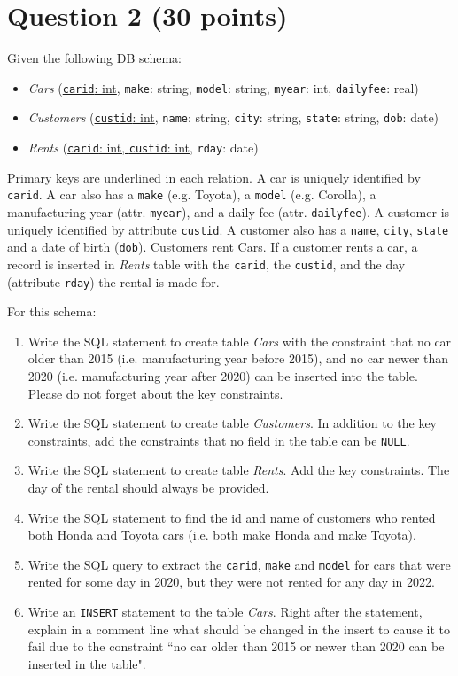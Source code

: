 \documentclass[letterpaper, 11pt]{article}
\begin{document}
\section*{Question 2 (30 points)}

Given the following DB schema:
\begin{itemize}
    \item \textit{Cars} (\ul{\texttt{carid}: int}, \texttt{make}: string, \texttt{model}: string, \texttt{myear}: int, \texttt{dailyfee}: real)
    \item \textit{Customers} (\ul{\texttt{custid}: int}, \texttt{name}: string, \texttt{city}: string, \texttt{state}: string, \texttt{dob}: date)
    \item \textit{Rents} (\ul{\texttt{carid}: int, \texttt{custid}: int}, \texttt{rday}: date)
\end{itemize}

Primary keys are underlined in each relation. A car is uniquely identified by \texttt{carid}. A car also has a \texttt{make} (e.g. Toyota), a \texttt{model} (e.g. Corolla), a manufacturing year (attr. \texttt{myear}), and a daily fee (attr. \texttt{dailyfee}). A customer is uniquely identified by attribute \texttt{custid}. A customer also has a \texttt{name}, \texttt{city}, \texttt{state} and a date of birth (\texttt{dob}). Customers rent Cars. If a customer rents a car, a record is inserted in \textit{Rents} table with the \texttt{carid}, the \texttt{custid}, and the day (attribute \texttt{rday}) the rental is made for.

For this schema:
\begin{enumerate}[label={\alph*}),leftmargin=*]
    \item Write the SQL statement to create table \textit{Cars} with the constraint that no car older than 2015 (i.e. manufacturing year before 2015), and no car newer than 2020 (i.e. manufacturing year after 2020) can be inserted into the table. Please do not forget about the key constraints. 
    \item Write the SQL statement to create table \textit{Customers}. In addition to the key constraints, add the constraints that no field in the table can be \texttt{NULL}.
    \item Write the SQL statement to create table \textit{Rents}. Add the key constraints. The day of the rental should always be provided.
    \item Write the SQL statement to find the id and name of customers who rented both Honda and Toyota cars (i.e. both make Honda and make Toyota).
    \item Write the SQL query to extract the \texttt{carid}, \texttt{make} and \texttt{model} for cars that were rented for some day in 2020, but they were not rented for any day in 2022.
    \item Write an \texttt{INSERT} statement to the table \textit{Cars}. Right after the statement, explain in a comment line what should be changed in the insert to cause it to fail due to the constraint ``no car older than 2015 or newer than 2020 can be inserted in the table".
\end{enumerate}
\end{document}
